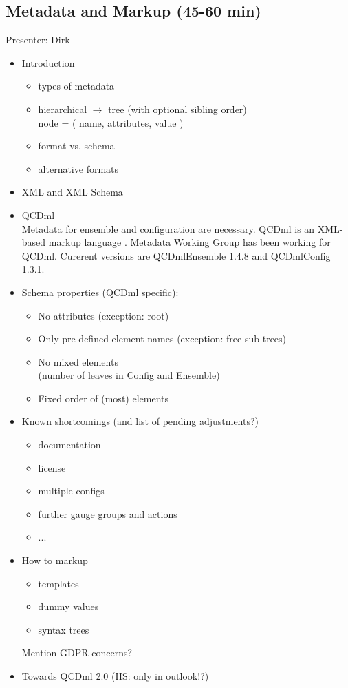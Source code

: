 \documentclass{article}
\begin{document}
\subsection{Metadata and Markup (45-60 min)}
Presenter: Dirk
\begin{itemize}
    \item Introduction
    \begin{itemize}
        \item types of metadata
        \item hierarchical $\to$ tree (with optional sibling order)\\
        node = ( name, attributes, value )
        \item format vs. schema
        \item alternative formats
    \end{itemize}
    \item XML and XML Schema
    \item QCDml \cite{Maynard:2004wg,Coddington:2007gz} \\
    Metadata for ensemble and configuration are necessary.
    QCDml is an XML-based markup language
    \cite{Maynard:2004wg,Coddington:2007gz}.
    Metadata Working Group has been working for QCDml.
    Curerent versions are QCDmlEnsemble 1.4.8 and
    QCDmlConfig 1.3.1.

    \item Schema properties (QCDml specific):
        \begin{itemize}
        \item No attributes (exception: root)
        \item Only pre-defined element names (exception: free sub-trees)
        \item No mixed elements \\
        (number of leaves in Config and Ensemble)
        \item Fixed order of (most) elements
        \end{itemize}
    \item Known shortcomings (and list of pending adjustments?)
        \begin{itemize}
        \item documentation
        \item license
        \item multiple configs
        \item further gauge groups and actions
        \item ...
        \end{itemize}
    \item How to markup
    \begin{itemize}
        \item templates
        \item dummy values
        \item syntax trees
    \end{itemize}
    Mention GDPR concerns?
    \item Towards QCDml 2.0 (HS: only in outlook!?)
\end{itemize}
\end{document}
